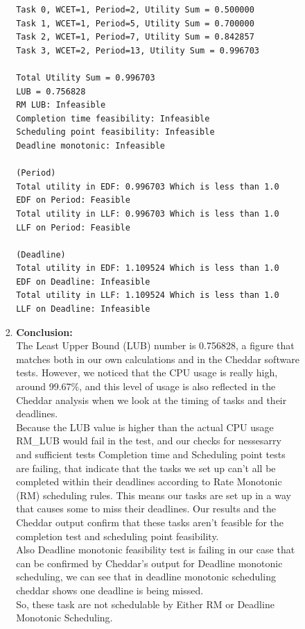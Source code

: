 \documentclass[a4paper,11pt]{article}%
\newenvironment{qanda}{\setlength{\parindent}{0pt}}{\bigskip}
\begin{document}
\begin{qanda}
\begin{enumerate}
\begin{enumerate}
\begin{enumerate}
\begin{enumerate}
\begin{verbatim}
Task 0, WCET=1, Period=2, Utility Sum = 0.500000
Task 1, WCET=1, Period=5, Utility Sum = 0.700000
Task 2, WCET=1, Period=7, Utility Sum = 0.842857
Task 3, WCET=2, Period=13, Utility Sum = 0.996703

Total Utility Sum = 0.996703
LUB = 0.756828
RM LUB: Infeasible
Completion time feasibility: Infeasible
Scheduling point feasibility: Infeasible
Deadline monotonic: Infeasible

(Period)
Total utility in EDF: 0.996703 Which is less than 1.0
EDF on Period: Feasible
Total utility in LLF: 0.996703 Which is less than 1.0
LLF on Period: Feasible

(Deadline)
Total utility in EDF: 1.109524 Which is less than 1.0
EDF on Deadline: Infeasible
Total utility in LLF: 1.109524 Which is less than 1.0
LLF on Deadline: Infeasible
										\end{verbatim}
						            \item \textbf{Conclusion:}\\
						                  The Least Upper Bound (LUB) number is 0.756828, a figure that matches both in our own calculations and in the Cheddar software tests. However, we noticed that the CPU usage is really high, around 99.67\%, and this level of usage is also reflected in the Cheddar analysis when we look at the timing of tasks and their deadlines.\\

						                  Because the LUB value is higher than the actual CPU usage RM\_LUB would fail in the test, and our checks for nessesarry and sufficient tests Completion time and Scheduling point tests are failing, that indicate that the tasks we set up can't all be completed within their deadlines according to Rate Monotonic (RM) scheduling rules. This means our tasks are set up in a way that causes some to miss their deadlines. Our results and the Cheddar output confirm that these tasks aren't feasible for the completion test and scheduling point feasibility.\\

						                  Also Deadline monotonic feasibility test is failing in our case that can be confirmed by Cheddar's output for Deadline monotonic scheduling, we can see that in deadline monotonic scheduling cheddar shows one deadline is being missed. \\

						                  So, these task are not schedulable by Either RM or Deadline Monotonic Scheduling.


\end{enumerate}
\end{enumerate}
\end{enumerate}
\end{enumerate}
\end{qanda}
\end{document}
